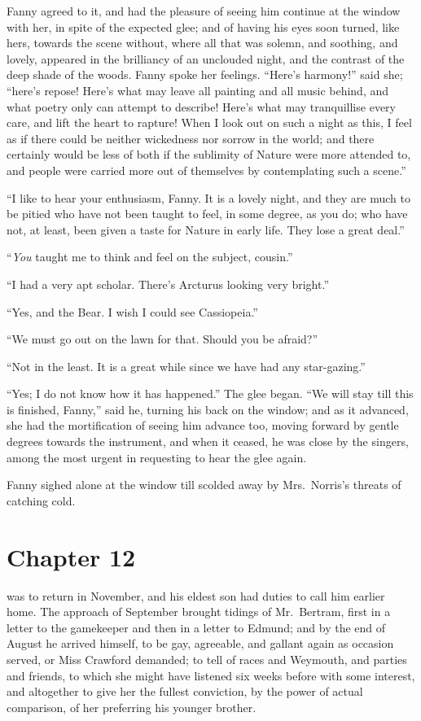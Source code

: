 Fanny agreed to it, and had the pleasure of seeing him continue
at the window with her, in spite of the expected glee;
and of having his eyes soon turned, like hers, towards the
scene without, where all that was solemn, and soothing,
and lovely, appeared in the brilliancy of an unclouded night,
and the contrast of the deep shade of the woods.  Fanny spoke
her feelings.  ``Here's harmony!'' said she; ``here's repose!
Here's what may leave all painting and all music behind,
and what poetry only can attempt to describe!  Here's what
may tranquillise every care, and lift the heart to rapture!
When I look out on such a night as this, I feel as if there
could be neither wickedness nor sorrow in the world;
and there certainly would be less of both if the sublimity
of Nature were more attended to, and people were carried
more out of themselves by contemplating such a scene.''

``I like to hear your enthusiasm, Fanny.  It is a lovely night,
and they are much to be pitied who have not been taught
to feel, in some degree, as you do; who have not,
at least, been given a taste for Nature in early life.
They lose a great deal.''

``\emph{You} taught me to think and feel on the subject, cousin.''

``I had a very apt scholar.  There's Arcturus looking
very bright.''

``Yes, and the Bear.  I wish I could see Cassiopeia.''

``We must go out on the lawn for that.  Should you be afraid?''

``Not in the least.  It is a great while since we have
had any star-gazing.''

``Yes; I do not know how it has happened.''  The glee began.
``We will stay till this is finished, Fanny,'' said he,
turning his back on the window; and as it advanced,
she had the mortification of seeing him advance too,
moving forward by gentle degrees towards the instrument,
and when it ceased, he was close by the singers, among the most
urgent in requesting to hear the glee again.

Fanny sighed alone at the window till scolded away
by Mrs.\ Norris's threats of catching cold.



\chapter{Chapter 12}

 was to return in November, and his eldest
son had duties to call him earlier home.  The approach
of September brought tidings of Mr.\ Bertram, first in a
letter to the gamekeeper and then in a letter to Edmund;
and by the end of August he arrived himself, to be gay,
agreeable, and gallant again as occasion served,
or Miss Crawford demanded; to tell of races and Weymouth,
and parties and friends, to which she might have listened
six weeks before with some interest, and altogether
to give her the fullest conviction, by the power
of actual comparison, of her preferring his younger brother.

